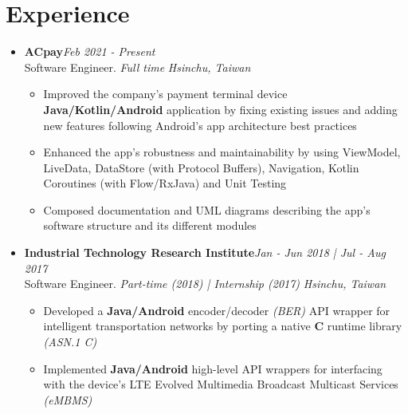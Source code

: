\section{\sectionheading Experience}

\begin{itemize}[leftmargin=0pt, label={}]%

\item{
{\sectionheading\large{\textbf{ACpay}}}\hfill {\sectionheading\small{\textit{Feb 2021 - Present}}}\\
{\sectionheading\small{Software Engineer. \textit{Full time}}}\hfill
{\sectionheading\small{\textit{Hsinchu, Taiwan}}}

    \vspace{-6pt}
    \begin{itemize}[label=\textbullet, leftmargin=*, noitemsep]
        \item{Improved the company's payment terminal device \textbf{Java/Kotlin/Android} application by fixing existing issues and adding new features following Android's app architecture best practices}
        \item{Enhanced the app's robustness and maintainability by using ViewModel, LiveData, DataStore (with Protocol Buffers), Navigation, Kotlin Coroutines (with Flow/RxJava) and Unit Testing}
        \item{Composed documentation and UML diagrams describing the app's software structure and its different modules}
    \end{itemize}
}

\item{
{\sectionheading\large{\textbf{Industrial Technology Research Institute}}}\hfill {\sectionheading\small{\textit{Jan - Jun 2018 | Jul - Aug 2017}}}\\
{\sectionheading\small{Software Engineer. \textit{Part-time (2018) | Internship (2017)}}}\hfill
{\sectionheading\small{\textit{Hsinchu, Taiwan}}}

    \vspace{-6pt}
    \begin{itemize}[label=\textbullet, leftmargin=*, noitemsep]
        \item{Developed a \textbf{Java/Android} encoder/decoder \textit{(BER)} API wrapper for intelligent transportation networks by porting a native \textbf{C} runtime library \textit{(ASN.1 C)}}
        \item{Implemented \textbf{Java/Android} high-level API wrappers for interfacing with the device's LTE Evolved Multimedia Broadcast Multicast Services \textit{(eMBMS)}}
    \end{itemize}
}


\end{itemize}
